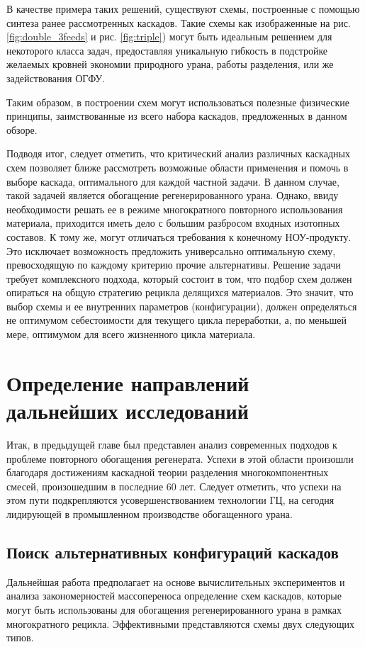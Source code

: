 В качестве примера таких решений, существуют схемы, построенные с помощью синтеза ранее рассмотренных каскадов.
Такие схемы как изображенные на рис. \ref{fig:double_3feeds} и рис. \ref{fig:triple}) могут быть идеальным решением для некоторого класса задач, предоставляя уникальную гибкость в подстройке желаемых кровней экономии природного урана, работы разделения, или же задействования ОГФУ.

Таким образом, в построении схем могут использоваться полезные физические принципы, заимствованные из всего набора каскадов, предложенных в данном обзоре.

Подводя итог, следует отметить, что критический анализ различных каскадных схем позволяет ближе рассмотреть возможные области применения и помочь в выборе каскада, оптимального для каждой частной задачи.
В данном случае, такой задачей является обогащение регенерированного урана.
Однако, ввиду необходимости решать ее в режиме многократного повторного использования материала, приходится иметь дело с большим разбросом входных изотопных составов.
К тому же, могут отличаться требования к конечному НОУ-продукту.
Это исключает возможность предложить универсально оптимальную схему, превосходящую по каждому критерию прочие альтернативы.
Решение задачи требует комплексного подхода, который состоит в том, что подбор схем должен опираться на общую стратегию рецикла делящихся материалов.
Это значит, что выбор схемы и ее внутренних параметров (конфигурации), должен определяться не оптимумом себестоимости для текущего цикла переработки, а, по меньшей мере, оптимумом для всего жизненного цикла материала.

\section{Определение направлений дальнейших исследований}

Итак, в предыдущей главе был представлен анализ современных подходов к проблеме повторного обогащения регенерата.
Успехи в этой области произошли благодаря достижениям каскадной теории разделения многокомпонентных смесей, произошедшим в последние 60 лет.
Следует отметить, что успехи на этом пути подкрепляются усовершенствованием технологии ГЦ, на сегодня лидирующей в промышленном производстве обогащенного урана.

\subsection{Поиск альтернативных конфигураций каскадов}
Дальнейшая работа предполагает на основе вычислительных экспериментов и анализа закономерностей массопереноса определение схем каскадов, которые могут быть использованы для обогащения регенерированного урана в рамках многократного рецикла.
Эффективными представляются схемы двух следующих типов.

